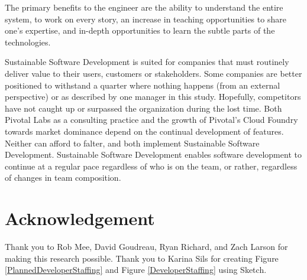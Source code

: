 The primary benefits to the engineer are the ability to understand the entire system, to work on every story, an increase in teaching opportunities to share one's expertise, and in-depth opportunities to learn the subtle parts of the technologies. 


Sustainable Software Development is suited for companies that must routinely deliver value to their users, customers or stakeholders. Some companies are better positioned to withstand a quarter where nothing happens (from an external perspective) or   as described by one manager in this study. Hopefully, competitors have not caught up or surpassed the organization during the lost time. Both Pivotal Labs as a consulting practice and the growth of Pivotal's Cloud Foundry towards market dominance depend on the continual development of features. Neither can afford to falter, and both implement Sustainable Software Development. Sustainable Software Development enables software development to continue at a regular pace regardless of who is on the team, or rather, regardless of changes in team composition.

\section{Acknowledgement}

Thank you to Rob Mee, David Goudreau, Ryan Richard, and Zach Larson for making this research possible. Thank you to Karina Sils for creating Figure \ref{PlannedDeveloperStaffing} and Figure \ref{DeveloperStaffing} using Sketch.
